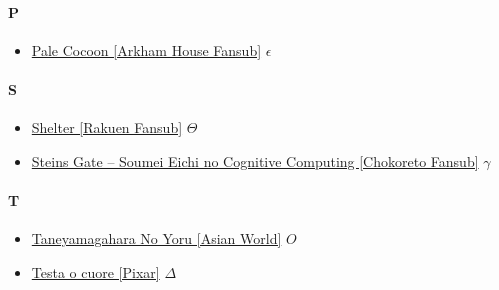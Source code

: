 		\paragraph{P} \hypertarget{CP}{}
			\begin{itemize}
				\item \href{https://mega.nz/#!l9xyzJiY!C6cWzBQEWcTbyA2q7C_lEH7SgJgGj7GLWo0BVsw2bsI} {Pale Cocoon [Arkham House Fansub]} $\epsilon$ \\ 
				
			\end{itemize}
			
		\paragraph{S} \hypertarget{CS}{}
			\begin{itemize}
				\item \href{https://mega.nz/#F!8KQhDbBB!V6qnrvLz1KL2wwyztNeZWA} {Shelter [Rakuen Fansub]} $\varTheta$ \\ 
				\item \href{https://mega.nz/#F!dhRCTKCC!76IEBxG5_MjPfEV1CToLSQ} {Steins Gate – Soumei Eichi no Cognitive Computing [Chokoreto Fansub]} $\gamma$ \\ 
				
			\end{itemize}
		
		\paragraph{T} \hypertarget{CT}{}
			\begin{itemize}
				\item \href{https://mega.nz/#!M6ozhCoR!3xKwKwZctF-2Q7D93U8Mx79DaDw3cB60wsDoSOkFZcw} {Taneyamagahara No Yoru [Asian World]} $O$   \\
				\item \href{https://mega.nz/#!ovxRURSJ!iw62J73plF-Rl7y48CWXiIaOBgS4yvTWxOwaPG_v9bA} {Testa o cuore [Pixar]} $\varDelta$   \\
			
			\end{itemize}
		